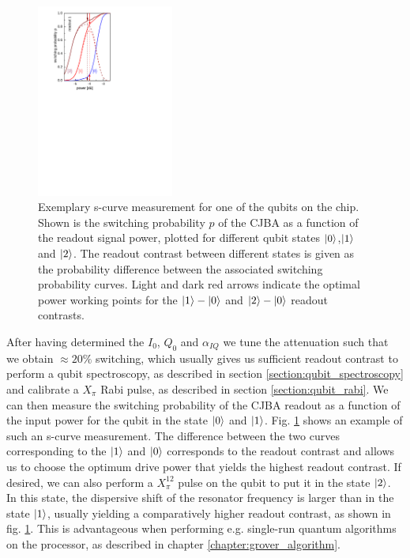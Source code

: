 \begin{figure}
\centering
\includegraphics[width=0.4\textwidth]{./material/papers/grover/figures/s_curves_example}
\caption{Exemplary s-curve measurement for one of the qubits on the chip. Shown is the switching probability $p$ of the CJBA as a function of the readout signal power, plotted for different qubit states $\left| 0 \right>$,$\left| 1 \right>$ and $\left| 2 \right>$. The readout contrast between different states is given as the probability difference between the associated switching probability curves. Light and dark red arrows indicate the optimal power working points for the $\left| 1 \right>-\left| 0 \right>$ and $\left| 2 \right>-\left| 0 \right>$ readout contrasts.}
\label{fig:s_curves_example}
\end{figure}

\smallskip

After having determined the $I_0$, $Q_0$ and $\alpha_{IQ}$ we tune the attenuation such that we obtain $\approx 20\%$ switching, which usually gives us sufficient readout contrast to perform a qubit spectroscopy, as described in section \ref{section:qubit_spectroscopy} and calibrate a $X_\pi$ Rabi pulse, as described in section \ref{section:qubit_rabi}. We can then measure the switching probability of the CJBA readout as a function of the input power for the qubit in the state $\left| 0 \right>$ and $\left| 1 \right>$. Fig. \ref{fig:s_curves_example} shows an example of such an s-curve measurement. The difference between the two curves corresponding to the $\left| 1 \right>$ and $\left| 0 \right>$ corresponds to the readout contrast and allows us to choose the optimum drive power that yields the highest readout contrast. If desired, we can also perform a $X_\pi^{12}$ pulse on the qubit to put it in the state $\left| 2 \right>$. In this state, the dispersive shift of the resonator frequency is larger than in the state $\left| 1 \right>$, usually yielding a comparatively higher readout contrast, as shown in fig. \ref{fig:s_curves_example}. This is advantageous when performing e.g. single-run quantum algorithms on the processor, as described in chapter \ref{chapter:grover_algorithm}.

